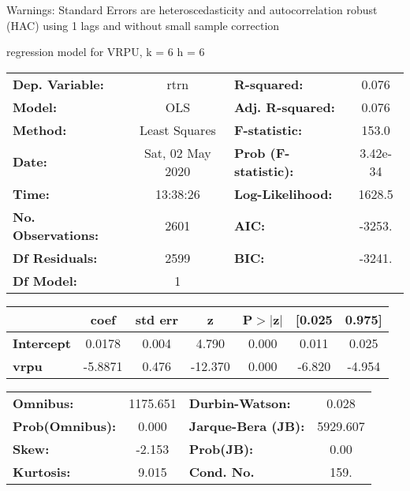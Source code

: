Warnings: \newline
 [1] Standard Errors are heteroscedasticity and autocorrelation robust (HAC) using 1 lags and without small sample correction\ 

regression model for VRPU, k = 6 h = 6\begin{center}
\begin{tabular}{lclc}
\toprule
\textbf{Dep. Variable:}    &       rtrn       & \textbf{  R-squared:         } &     0.076   \\
\textbf{Model:}            &       OLS        & \textbf{  Adj. R-squared:    } &     0.076   \\
\textbf{Method:}           &  Least Squares   & \textbf{  F-statistic:       } &     153.0   \\
\textbf{Date:}             & Sat, 02 May 2020 & \textbf{  Prob (F-statistic):} &  3.42e-34   \\
\textbf{Time:}             &     13:38:26     & \textbf{  Log-Likelihood:    } &    1628.5   \\
\textbf{No. Observations:} &        2601      & \textbf{  AIC:               } &    -3253.   \\
\textbf{Df Residuals:}     &        2599      & \textbf{  BIC:               } &    -3241.   \\
\textbf{Df Model:}         &           1      & \textbf{                     } &             \\
\bottomrule
\end{tabular}
\begin{tabular}{lcccccc}
                   & \textbf{coef} & \textbf{std err} & \textbf{z} & \textbf{P$> |$z$|$} & \textbf{[0.025} & \textbf{0.975]}  \\
\midrule
\textbf{Intercept} &       0.0178  &        0.004     &     4.790  &         0.000        &        0.011    &        0.025     \\
\textbf{vrpu}      &      -5.8871  &        0.476     &   -12.370  &         0.000        &       -6.820    &       -4.954     \\
\bottomrule
\end{tabular}
\begin{tabular}{lclc}
\textbf{Omnibus:}       & 1175.651 & \textbf{  Durbin-Watson:     } &    0.028  \\
\textbf{Prob(Omnibus):} &   0.000  & \textbf{  Jarque-Bera (JB):  } & 5929.607  \\
\textbf{Skew:}          &  -2.153  & \textbf{  Prob(JB):          } &     0.00  \\
\textbf{Kurtosis:}      &   9.015  & \textbf{  Cond. No.          } &     159.  \\
\bottomrule
\end{tabular}
\end{center}

